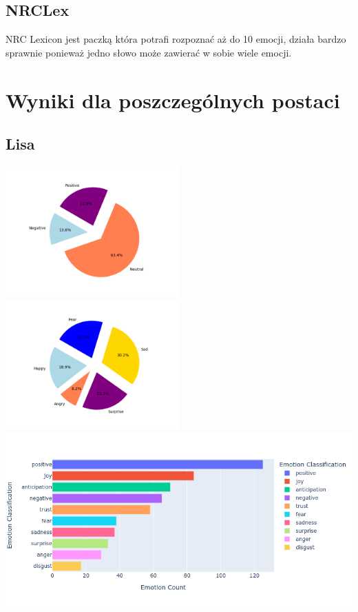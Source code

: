 \documentclass[a4paper,12pt]{article}
\begin{document}
	\subsection{NRCLex}
	NRC Lexicon jest paczką która potrafi rozpoznać aż do 10 emocji, działa bardzo sprawnie ponieważ jedno słowo może zawierać w sobie wiele emocji.
	\clearpage
	\section {Wyniki dla poszczególnych postaci}
	\subsection{Lisa}
	{\includegraphics[height=5cm]{lisasVaderEmotionalPie.png}}
	{\includegraphics[height=5cm]{lisasEmotionalPie.png}}\\
	{\includegraphics[width=17cm]{lisaNrcImage.png}}\\
	\clearpage
\end{document}
